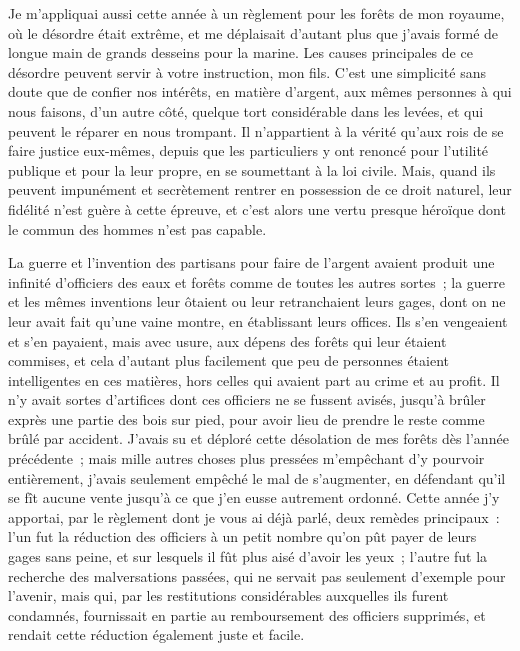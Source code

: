 \documentclass[french,twoside]{book} %
\begin{document}
Je m’appliquai aussi cette année à un règlement pour les forêts de mon royaume, où le désordre était extrême, et me déplaisait d’autant plus que j’avais formé de longue main de grands desseins pour la marine. Les causes principales de ce désordre peuvent servir à votre instruction, mon fils. C’est une simplicité sans doute que de confier nos intérêts, en matière d’argent, aux mêmes personnes à qui nous faisons, d’un autre côté, quelque tort considérable dans les levées, et qui peuvent le réparer en nous trompant. Il n’appartient à la vérité qu’aux rois de se faire justice eux-mêmes, depuis que les particuliers y ont renoncé pour l’utilité publique et pour la leur propre, en se soumettant à la loi civile. Mais, quand ils peuvent impunément et secrètement rentrer en possession de ce droit naturel, leur fidélité n’est guère à cette épreuve, et c’est alors une vertu presque héroïque dont le commun des hommes n’est pas capable.\par
La guerre et l’invention des partisans pour faire de l’argent avaient produit une infinité d’officiers des eaux et forêts comme de toutes les autres sortes ; la guerre et les mêmes inventions leur ôtaient ou leur retranchaient leurs gages, dont on ne leur avait fait qu’une vaine montre, en établissant leurs offices. Ils s’en vengeaient et s’en payaient, mais avec usure, aux dépens des forêts qui leur étaient commises, et cela d’autant plus facilement que peu de personnes étaient intelligentes en ces matières, hors celles qui avaient part au crime et au profit. Il n’y avait sortes d’artifices dont ces officiers ne se fussent avisés, jusqu’à brûler exprès une partie des bois sur pied, pour avoir lieu de prendre le reste comme brûlé par accident. J’avais su et déploré cette désolation de mes forêts dès l’année précédente ; mais mille autres choses plus pressées m’empêchant d’y pourvoir entièrement, j’avais seulement empêché le mal de s’augmenter, en défendant qu’il se fît aucune vente jusqu’à ce que j’en eusse autrement ordonné. Cette année j’y apportai, par le règlement dont je vous ai déjà parlé, deux remèdes principaux : l’un fut la réduction des officiers à un petit nombre qu’on pût payer de leurs gages sans peine, et sur lesquels il fût plus aisé d’avoir les yeux ; l’autre fut la recherche des malversations passées, qui ne servait pas seulement d’exemple pour l’avenir, mais qui, par les restitutions considérables auxquelles ils furent condamnés, fournissait en partie au remboursement des officiers supprimés, et rendait cette réduction également juste et facile.\par
\end{document}
